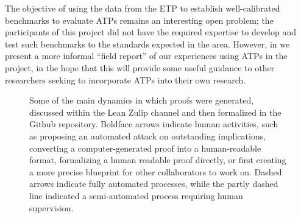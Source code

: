 The objective of using the data from the ETP to establish well-calibrated benchmarks to evaluate ATPs remains an interesting open problem; the participants of this project did not have the required expertise to develop and test such benchmarks to the standards expected in the area.  However, in  we present a more informal ``field report'' of our experiences using ATPs in the project, in the hope that this will provide some useful guidance to other researchers seeking to incorporate ATPs into their own research.

\begin{figure}
\centering
{}
\caption{Some of the main dynamics in which proofs were generated, discussed within the Lean Zulip channel and then formalized in the Github repository.  Boldface arrows indicate human activities, such as proposing an automated attack on outstanding implications, converting a computer-generated proof into a human-readable format, formalizing a human readable proof directly, or first creating a more precise blueprint for other collaborators to work on.  Dashed arrows indicate fully automated processes, while the partly dashed line indicated a semi-automated process requiring human supervision. }
\label{fig:flow}
\end{figure}


